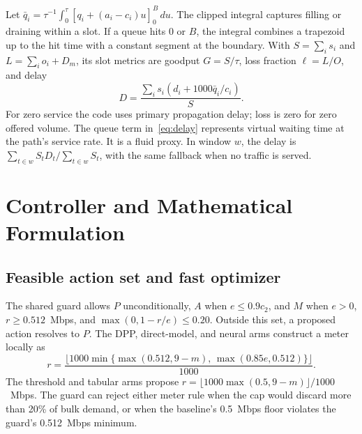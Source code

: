 \documentclass[conference]{IEEEtran}
\begin{document}
Let \(\bar q_i=\tau^{-1}\int_0^\tau[q_i+(a_i-c_i)u]_0^B\,du\). The clipped integral captures filling or draining within a slot. If a queue hits 0 or \(B\), the integral combines a trapezoid up to the hit time with a constant segment at the boundary. With \(S=\sum_i s_i\) and \(L=\sum_i o_i+D_m\), its slot metrics are goodput \(G=S/\tau\), loss fraction \(\ell=L/O\), and delay
\begin{equation}
D=\frac{\sum_i s_i(d_i+1000\bar q_i/c_i)}{S}.
\label{eq:delay}
\end{equation}
For zero service the code uses primary propagation delay; loss is zero for zero offered volume. The queue term in~\eqref{eq:delay} represents virtual waiting time at the path's service rate. It is a fluid proxy. In window \(w\), the delay is \(\sum_{t\in w} S_tD_t/\sum_{t\in w}S_t\), with the same fallback when no traffic is served.

\section{Controller and Mathematical Formulation}
\subsection{Feasible action set and fast optimizer}
The shared guard allows \(P\) unconditionally, \(A\) when \(e\leq0.9c_2\), and \(M\) when \(e>0\), \(r\geq0.512\)~Mbps, and \(\max(0,1-r/e)\leq0.20\). Outside this set, a proposed action resolves to \(P\). The DPP, direct-model, and neural arms construct a meter locally as
\begin{equation}
r=\frac{\lfloor 1000\min\{\max(0.512,9-m),\,
                          \max(0.85e,0.512)\}\rfloor}{1000}.
\label{eq:meter}
\end{equation}
The threshold and tabular arms propose \(r=\lfloor1000\max(0.5,9-m)\rfloor/1000\)~Mbps. The guard can reject either meter rule when the cap would discard more than 20\% of bulk demand, or when the baseline's 0.5~Mbps floor violates the guard's 0.512~Mbps minimum.
\end{document}
